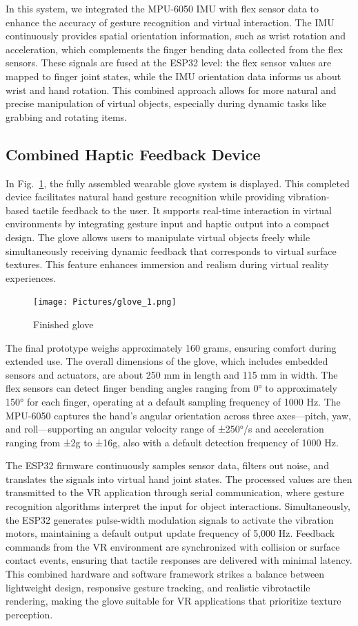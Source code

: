 In this system, we integrated the MPU-6050 IMU with flex sensor data to enhance the accuracy of gesture recognition and virtual interaction. The IMU continuously provides spatial orientation information, such as wrist rotation and acceleration, which complements the finger bending data collected from the flex sensors. These signals are fused at the ESP32 level: the flex sensor values are mapped to finger joint states, while the IMU orientation data informs us about wrist and hand rotation. This combined approach allows for more natural and precise manipulation of virtual objects, especially during dynamic tasks like grabbing and rotating items.

\subsection{Combined Haptic Feedback Device}
In Fig.~\ref{fig:finalglove}, the fully assembled wearable glove system is displayed. This completed device facilitates natural hand gesture recognition while providing vibration-based tactile feedback to the user. It supports real-time interaction in virtual environments by integrating gesture input and haptic output into a compact design. The glove allows users to manipulate virtual objects freely while simultaneously receiving dynamic feedback that corresponds to virtual surface textures. This feature enhances immersion and realism during virtual reality experiences.

\begin{figure}[H]\centering
	\texttt{[image: Pictures/glove\_1.png]}%
	\caption{Finished glove}\label{fig:finalglove}%
\end{figure}

The final prototype weighs approximately 160 grams, ensuring comfort during extended use. The overall dimensions of the glove, which includes embedded sensors and actuators, are about 250 mm in length and 115 mm in width. The flex sensors can detect finger bending angles ranging from 0° to approximately 150° for each finger, operating at a default sampling frequency of 1000 Hz. The MPU-6050 captures the hand's angular orientation across three axes—pitch, yaw, and roll—supporting an angular velocity range of ±250°/s and acceleration ranging from ±2g to ±16g, also with a default detection frequency of 1000 Hz.

The ESP32 firmware continuously samples sensor data, filters out noise, and translates the signals into virtual hand joint states. The processed values are then transmitted to the VR application through serial communication, where gesture recognition algorithms interpret the input for object interactions. Simultaneously, the ESP32 generates pulse-width modulation signals to activate the vibration motors, maintaining a default output update frequency of 5,000 Hz. Feedback commands from the VR environment are synchronized with collision or surface contact events, ensuring that tactile responses are delivered with minimal latency. This combined hardware and software framework strikes a balance between lightweight design, responsive gesture tracking, and realistic vibrotactile rendering, making the glove suitable for VR applications that prioritize texture perception.